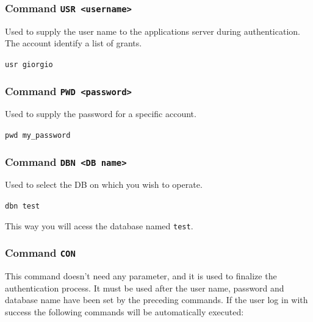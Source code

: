 \documentclass[12pt,titlepage]{book}
\begin{document}
\subsubsection{Command \tt{USR <username>}}
Used to supply the user name to the applications server during
authentication. The account identify a list of grants.

\bigskip
\verb|usr giorgio|
\bigskip

\subsubsection{Command \tt{PWD <password>}}
Used to supply the password for a specific account.

\bigskip
\verb|pwd my_password|
\bigskip


\subsubsection{Command \tt{DBN <DB name>}}
Used to select the DB on which you wish to operate.

\bigskip
\verb|dbn test|
\bigskip

This way you will acess the database named \verb|test|.


%
%

\subsubsection{Command \tt{CON}}
This command doesn't need any parameter, and it is used to finalize the
authentication process. It must be used after the user name, password and
database name have been set by the preceding commands. If the user log in with
success the following commands will be automatically executed:
\end{document}
